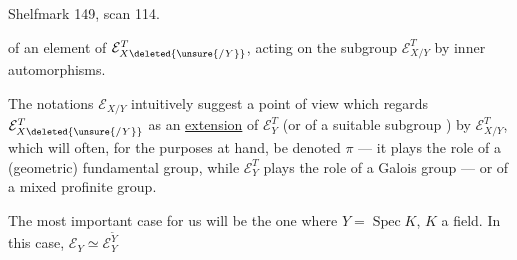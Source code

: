 Shelfmark 149, scan 114.


of an element of $\mathcal E_{X\deleted{\unsure{/Y}}}^T$, acting on the subgroup $\mathcal E_{X/Y}^T$ by inner automorphisms.

The notations  $\mathcal E_{X/Y}$ intuitively suggest a point of view which regards $\mathcal E_{X\deleted{\unsure{/Y}}}^T$ as an \uline{extension} of $\mathcal E_Y^T$ (or of a suitable subgroup ) by $\mathcal E_{X/Y}^T$, which will often, for the purposes at hand, be denoted $\pi$ --- it plays the role of a (geometric) fundamental group, while $\mathcal E_Y^T$ plays the role of a Galois group --- or of a mixed profinite group.


The most important case for us will be the one where $Y=\operatorname{Spec}K$, $K$ a field.  In this case, $\mathcal E_Y\simeq\mathcal E_Y^{\widetilde Y}$

